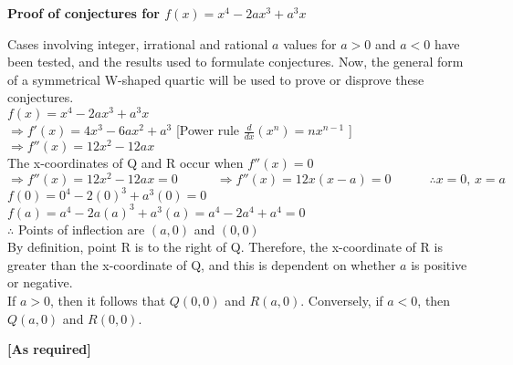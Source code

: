 \documentclass{homework}
\begin{document}
\begin{center}
    \textbf{Proof of conjectures for $f(x)=x^4-2ax^3+a^3x$} \vspace{0.8em}
\end{center}
\begin{flushleft}
    Cases involving integer, irrational and rational  $a$ values for $a>0$ and $a<0$ have been tested, and the results used to formulate conjectures. Now, the general form of a symmetrical W-shaped quartic will be used to prove or disprove these conjectures. \vspace{0.6em} \\
    $f(x)=x^4-2ax^3+a^3x$ \vspace{0.5em}\\
    $\Rightarrow f'(x)=4x^3-6ax^2+a^3$ \hspace{3em} [Power rule $\frac{d}{dx}(x^n)=nx^{n-1}$ ]\vspace{0.5em}\\
    $\Rightarrow f''(x)=12x^2-12ax$ \vspace{0.5em}\\
    The x-coordinates of Q and R occur when $f''(x)=0$ \vspace{0.5em} \\
    $\Rightarrow f''(x)=12x^2-12ax=0 \hspace{3em} \Rightarrow f''(x)=12x(x-a)=0 \hspace{3em} \therefore x=0, \, x=a$ \vspace{1.3em}\\
    $f(0)=0^4-2(0)^3+a^3(0)=0$ \hspace{3em} $f(a)=a^4-2a(a)^3+a^3(a)=a^4-2a^4+a^4=0$\vspace{0.5em}\\
    $\therefore$ Points of inflection are $(a,0)$ and $(0,0)$ \vspace{0.9em}\\
    By definition, point R is to the right of Q. Therefore, the x-coordinate of R is greater than the x-coordinate of Q, and this is dependent on whether $a$ is positive or negative. \vspace{0.5em} \\
    If $a>0$, then it follows that $Q(0,0)$ and $R(a,0)$. \hspace{3em} Conversely, if $a<0$, then $Q(a,0)$ and $R(0,0)$. \vspace{0.5em} \\
    \end{flushleft}
    \begin{flushright}
    \textbf{[As required]} \vspace{1.2em}
    \end{flushright}
\end{document}

